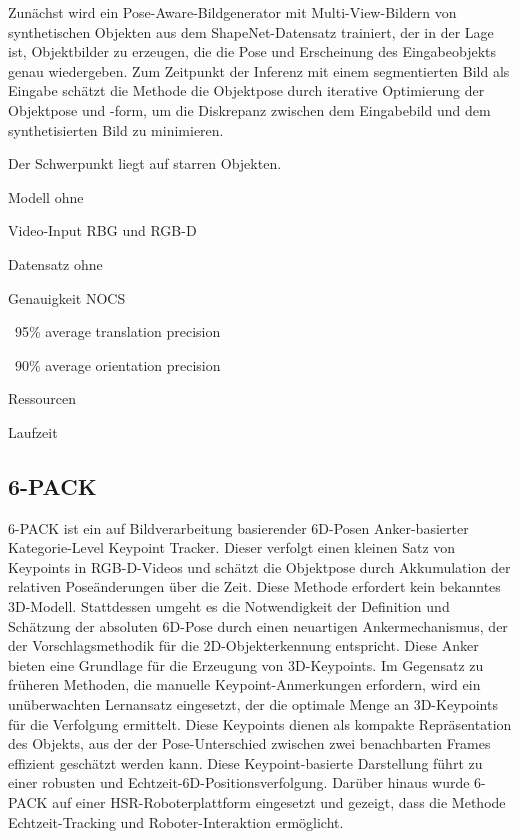 \documentclass[a4paper, 11pt]{article}
\begin{document}
\begin{multicols*}{2}
    Zunächst wird ein Pose-Aware-Bildgenerator mit Multi-View-Bildern von synthetischen Objekten aus dem ShapeNet-Datensatz trainiert, der in der Lage ist, Objektbilder zu erzeugen, die die Pose und Erscheinung des Eingabeobjekts genau wiedergeben. Zum Zeitpunkt der Inferenz mit einem segmentierten Bild als Eingabe schätzt die Methode die Objektpose durch iterative Optimierung der Objektpose und -form, um die Diskrepanz zwischen dem Eingabebild und dem synthetisierten Bild zu minimieren.

    Der Schwerpunkt liegt auf starren Objekten.
    \begin{description*}
        \item[Modell] ohne
        \item[Video-Input] RBG und RGB-D
        \item[Datensatz] ohne
        \item[Genauigkeit] \Gls{NOCS}
        \begin{itemize*}
            \item ~95\% average translation precision
            \item ~90\% average orientation precision
        \end{itemize*}
        \item[Ressourcen]
        \item[Laufzeit]
    \end{description*}

    \subsection{6-PACK}
    6-PACK\cite{6pack} ist ein auf Bildverarbeitung basierender 6D-Posen Anker-basierter Kategorie-Level Keypoint Tracker. Dieser verfolgt einen kleinen Satz von Keypoints in RGB-D-Videos und schätzt die Objektpose durch Akkumulation der relativen Poseänderungen über die Zeit. Diese Methode erfordert kein bekanntes 3D-Modell. Stattdessen umgeht es die Notwendigkeit der Definition und Schätzung der absoluten 6D-Pose durch einen neuartigen Ankermechanismus, der der Vorschlagsmethodik für die 2D-Objekterkennung entspricht. Diese Anker bieten eine Grundlage für die Erzeugung von 3D-Keypoints.
    Im Gegensatz zu früheren Methoden, die manuelle Keypoint-Anmerkungen erfordern, wird ein unüberwachten Lernansatz eingesetzt, der die optimale Menge an 3D-Keypoints für die Verfolgung ermittelt. Diese Keypoints dienen als kompakte Repräsentation des Objekts, aus der der Pose-Unterschied zwischen zwei benachbarten Frames effizient geschätzt werden kann. Diese Keypoint-basierte Darstellung führt zu einer robusten und Echtzeit-6D-Positionsverfolgung.
    Darüber hinaus wurde 6-PACK auf einer HSR-Roboterplattform eingesetzt und gezeigt, dass die Methode Echtzeit-Tracking und Roboter-Interaktion ermöglicht.


\end{multicols*}
\end{document}
